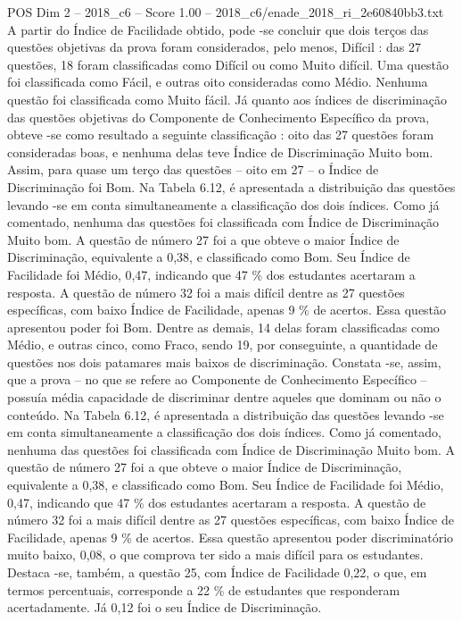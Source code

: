 \begin{textsample}{POS Dim 2 – 2018\_c6 – Score 1.00 – 2018\_c6/enade\_2018\_ri\_2e60840bb3.txt}
A partir do Índice de Facilidade obtido, pode -se concluir que dois terços das questões objetivas da prova foram considerados, pelo menos, Difícil : das 27 questões, 18 foram classificadas como Difícil ou como Muito difícil.
Uma questão foi classificada como Fácil, e outras oito consideradas como Médio.
Nenhuma questão foi classificada como Muito fácil.
Já quanto aos índices de discriminação das questões objetivas do Componente de Conhecimento Específico da prova, obteve -se como resultado a seguinte classificação : oito das 27 questões foram consideradas boas, e nenhuma delas teve Índice de Discriminação Muito bom.
Assim, para quase um terço das questões – oito em 27 – o Índice de Discriminação foi Bom.
Na Tabela 6.12, é apresentada a distribuição das questões levando -se em conta simultaneamente a classificação dos dois índices.
Como já comentado, nenhuma das questões foi classificada com Índice de Discriminação Muito bom.
A questão de número 27 foi a que obteve o maior Índice de Discriminação, equivalente a 0,38, e classificado como Bom.
Seu Índice de Facilidade foi Médio, 0,47, indicando que 47 \% dos estudantes acertaram a resposta.
A questão de número 32 foi a mais difícil dentre as 27 questões específicas, com baixo Índice de Facilidade, apenas 9 \% de acertos.
Essa questão apresentou poder foi Bom.
Dentre as demais, 14 delas foram classificadas como Médio, e outras cinco, como Fraco, sendo 19, por conseguinte, a quantidade de questões nos dois patamares mais baixos de discriminação.
Constata -se, assim, que a prova – no que se refere ao Componente de Conhecimento Específico – possuía média capacidade de discriminar dentre aqueles que dominam ou não o conteúdo.
Na Tabela 6.12, é apresentada a distribuição das questões levando -se em conta simultaneamente a classificação dos dois índices.
Como já comentado, nenhuma das questões foi classificada com Índice de Discriminação Muito bom.
A questão de número 27 foi a que obteve o maior Índice de Discriminação, equivalente a 0,38, e classificado como Bom.
Seu Índice de Facilidade foi Médio, 0,47, indicando que 47 \% dos estudantes acertaram a resposta.
A questão de número 32 foi a mais difícil dentre as 27 questões específicas, com baixo Índice de Facilidade, apenas 9 \% de acertos.
Essa questão apresentou poder discriminatório muito baixo, 0,08, o que comprova ter sido a mais difícil para os estudantes.
Destaca -se, também, a questão 25, com Índice de Facilidade 0,22, o que, em termos percentuais, corresponde a 22 \% de estudantes que responderam acertadamente.
Já 0,12 foi o seu Índice de Discriminação.

\end{textsample}
